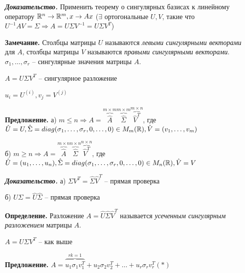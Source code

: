 \bigskip
\textbf{\textit{Доказательство.}} Применить теорему о сингулярных базисах к линейному оператору $\mathbb{R}^n \rightarrow \mathbb{R}^m, x \rightarrow Ax$ ($\exists$ ортогональные $U, V$, такие что $U^{-1} A V = \Sigma \Rightarrow A = U \Sigma V^{-1} = U \Sigma V^T$)

\bigskip
\textbf{Замечание.} Столбцы матрицы $U$ называются \textit{левыми сингулярными векторами} для $A$, столбцы матрицы $V$ называются \textit{правыми сингулярными векторами}. $\sigma_1, \dots, \sigma_r$ -- сингулярные значения матрицы $A$.

\bigskip
$A = U \Sigma V^T$ -- сингулярное разложение

$u_i = U^{(i)}, v_j = V^{(j)}$

\bigskip
\textbf{Предложение.} а) $m \leqslant n \Rightarrow A = \overbrace{\hat{A}}^{m \times m} \overbrace{\hat{\Sigma}}^{m \times m} \overbrace{\hat{V}^T}^{m \times n}$, где $\hat{U} = U, \hat{\Sigma} = diag(\sigma_1, \dots, \sigma_r, 0, \dots, 0) \in M_m(\mathbb{R}), \hat{V} = (v_1, \dots, v_m)$

б) $m \geqslant n \Rightarrow A = \overbrace{\hat{A}}^{m \times n} \overbrace{\hat{\Sigma}}^{n \times n} \overbrace{\hat{V}^T}^{n \times n}$, где $\hat{U} = (u_1, \dots, u_n), \hat{\Sigma} = diag(\sigma_1, \dots, \sigma_r, 0, \dots, 0) \in M_n(\mathbb{R}), \hat{V} = V$

\bigskip
\textbf{\textit{Доказательство.}} а) $\Sigma V^T = \hat{\Sigma} \hat{V}^T$ -- прямая проверка

б) $U \Sigma = \hat{U }\hat{\Sigma}$ -- прямая проверка

\bigskip
\textbf{Определение.} Разложение $A = \hat{U} \hat{\Sigma} \hat{V}^T$ называется \textit{усеченным сингулярным разложением} матрицы $A$.

\bigskip
$A = U \Sigma V^T$ -- как выше

\bigskip
\textbf{Предложение.} $A = \overbrace{u_1 \sigma_1 v_1^T}^{rk = 1} + u_2 \sigma_2 v_2^T + \dots + u_r \sigma_r v_r^T (*)$

